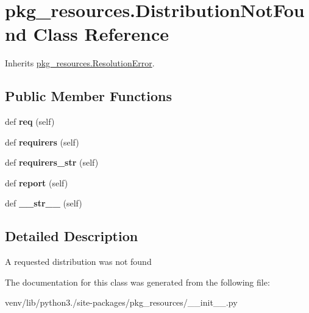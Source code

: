\hypertarget{classpkg__resources_1_1_distribution_not_found}{}\section{pkg\+\_\+resources.\+Distribution\+Not\+Found Class Reference}
\label{classpkg__resources_1_1_distribution_not_found}


Inherits \hyperlink{classpkg__resources_1_1_resolution_error}{pkg\+\_\+resources.\+Resolution\+Error}.

\subsection*{Public Member Functions}
\begin{DoxyCompactItemize}
\item 
\mbox{\label{classpkg__resources_1_1_distribution_not_found_a8e314724660036b768d78dc21103c22f}} 
def {\bfseries req} (self)
\item 
\mbox{\label{classpkg__resources_1_1_distribution_not_found_a9dbb675f62a1d689cb56637df1833c5e}} 
def {\bfseries requirers} (self)
\item 
\mbox{\label{classpkg__resources_1_1_distribution_not_found_a02cc1e7ec9433f9e21ec80848317a5c0}} 
def {\bfseries requirers\+\_\+str} (self)
\item 
\mbox{\label{classpkg__resources_1_1_distribution_not_found_a4a8415f4396d01b9d4a4ede6d58da543}} 
def {\bfseries report} (self)
\item 
\mbox{\label{classpkg__resources_1_1_distribution_not_found_a58510603e72537a2a7b1eb75307a8fcc}} 
def {\bfseries \+\_\+\+\_\+str\+\_\+\+\_\+} (self)
\end{DoxyCompactItemize}


\subsection{Detailed Description}
\begin{DoxyVerb}A requested distribution was not found\end{DoxyVerb}
 

The documentation for this class was generated from the following file\+:\begin{DoxyCompactItemize}
\item 
venv/lib/python3./site-\/packages/pkg\+\_\+resources/\+\_\+\+\_\+init\+\_\+\+\_\+.\+py\end{DoxyCompactItemize}
